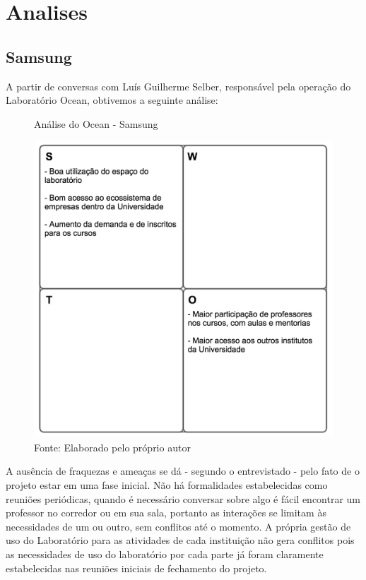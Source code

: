 \chapter{Analises}
\label{cha:analises}

\section{Samsung}

A partir de conversas com Luís Guilherme Selber, responsável pela operação do Laboratório Ocean, obtivemos a seguinte análise:

\begin{figure}[H]
\caption{Análise do Ocean - Samsung}
\centerline{\includegraphics[scale=0.75]{img/samsungswot}}
\label{fig:swotsamsung}
\caption* {Fonte: Elaborado pelo próprio autor}
\end{figure}

A ausência de fraquezas e ameaças se dá - segundo o entrevistado - pelo fato de o projeto estar em uma fase inicial. Não há formalidades estabelecidas como reuniões periódicas, quando é necessário conversar sobre algo é fácil encontrar um professor no corredor ou em sua sala, portanto as interações se limitam às necessidades de um ou outro, sem conflitos até o momento. A própria gestão de uso do Laboratório para as atividades de cada instituição não gera conflitos pois as necessidades de uso do laboratório por cada parte já foram claramente estabelecidas nas reuniões iniciais de fechamento do projeto.


